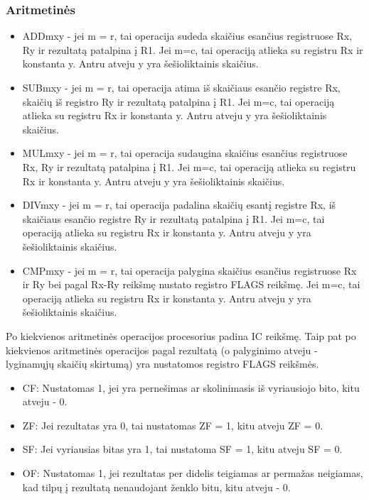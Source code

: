 \documentclass{VUMIFInfKursinis}
\begin{document}
\subsubsection{Aritmetinės}
\begin{itemize}
	\item ADDmxy - jei m = r, tai operacija sudeda skaičius esančius registruose Rx, Ry ir rezultatą patalpina į R1. Jei m=c, tai operaciją atlieka su registru Rx ir konstanta y. Antru atveju y yra šešioliktainis skaičius.
	\item SUBmxy - jei m = r, tai operacija atima iš skaičiaus esančio registre Rx, skaičių iš registro Ry ir rezultatą patalpina į R1. Jei m=c, tai operaciją atlieka su registru Rx ir konstanta y. Antru atveju y yra šešioliktainis skaičius.
	\item MULmxy - jei m = r, tai operacija sudaugina skaičius esančius registruose Rx, Ry ir rezultatą patalpina į R1. Jei m=c, tai operaciją atlieka su registru Rx ir konstanta y. Antru atveju y yra šešioliktainis skaičius.
	\item DIVmxy - jei m = r, tai operacija padalina skaičių esantį registre Rx, iš skaičiaus esančio registre Ry ir rezultatą patalpina į R1. Jei m=c, tai operaciją atlieka su registru Rx ir konstanta y. Antru atveju y yra šešioliktainis skaičius.
	\item CMPmxy - jei m = r, tai operacija palygina skaičius esančius registruose Rx ir Ry bei pagal Rx-Ry reikšmę nustato registro FLAGS reikšmę. Jei m=c, tai operaciją atlieka su registru Rx ir konstanta y. Antru atveju y yra šešioliktainis skaičius.
\end{itemize}

Po kiekvienos aritmetinės operacijos procesorius padina IC reikšmę. Taip pat po kiekvienos aritmetinės operacijos pagal rezultatą (o palyginimo atveju - lyginamųjų skaičių skirtumą) yra nustatomos registro FLAGS reikšmės.

\begin{itemize}
	\item CF: Nustatomas 1, jei yra pernešimas ar skolinimasis iš vyriausiojo bito, kitu atveju - 0.
	\item ZF: Jei rezultatas yra 0, tai nustatomas ZF = 1, kitu atveju ZF = 0.
	\item SF: Jei vyriausias bitas yra 1, tai nustatoma SF = 1, kitu atveju SF = 0.
	\item OF: Nustatomas 1, jei rezultatas per didelis teigiamas ar permažas neigiamas, kad tilpų į rezultatą nenaudojant ženklo bitu, kitu atveju - 0.
\end{itemize}
\end{document}
